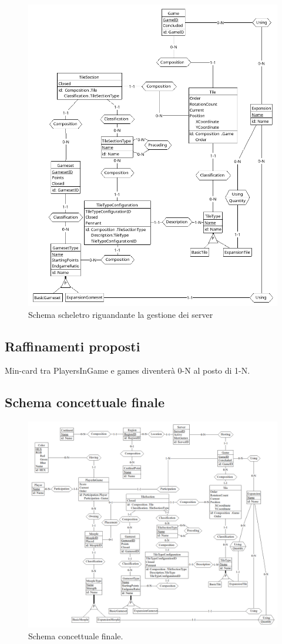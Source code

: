 \begin{figure}[hb]
    \centering\includegraphics[scale=0.24]{images/Progettazione/Concettuale/Scheletro3.png}
    \caption{Schema scheletro riguandante la gestione dei server}
\end{figure}

\subsection{Raffinamenti proposti}
Min-card tra PlayersInGame e games diventerà 0-N al posto di 1-N.
\medskip

\subsection{Schema concettuale finale}
\begin{figure}[hb]
    \centering\includegraphics[scale=0.24]{images/Progettazione/Concettuale/modello.png}
    \caption{Schema concettuale finale.}
\end{figure}